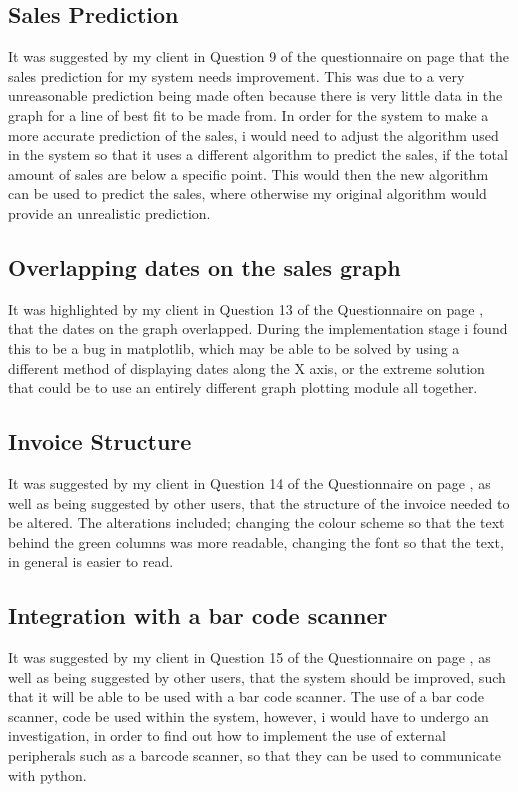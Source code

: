 \subsection{Sales Prediction}
It was suggested by my client in Question 9 of the questionnaire on page \pageref{Client-Q1} that the sales prediction for my system needs improvement. This was due to a very unreasonable prediction being made often because there is very little data in the graph for a line of best fit to be made from. In order for the system to make a more accurate prediction of the sales, i would need to adjust the algorithm used in the system so that it uses a different algorithm to predict the sales, if the total amount of sales are below a specific point. This would then the new algorithm can be used to predict the sales, where otherwise my original algorithm would provide an unrealistic prediction.

\subsection{Overlapping dates on the sales graph}
It was highlighted by my client in Question 13 of the Questionnaire on page \pageref{Client-Q1}, that the dates on the graph overlapped. During the implementation stage i found this to be a bug in matplotlib, which may be able to be solved by using a different method of displaying dates along the X axis, or the extreme solution that could be to use an entirely different graph plotting module all together.

\subsection{Invoice Structure}
It was suggested by my client in Question 14 of the Questionnaire  on page \pageref{Client-Q1}, as well as being suggested by other users, that the structure of the invoice needed to be altered. The alterations included; changing the colour scheme so that the text behind the green columns was more readable, changing the font so that the text, in general is easier to read.

\subsection{Integration with a bar code scanner}
It was suggested by my client in Question 15 of the Questionnaire  on page \pageref{Client-Q1}, as well as being suggested by other users, that the system should be improved, such that it will be able to be used with a bar code scanner. The use of a bar code scanner, code be used within the system, however, i would have to undergo an investigation, in order to find out how to implement the use of external peripherals such as a barcode scanner, so that they can be used to communicate with python.

